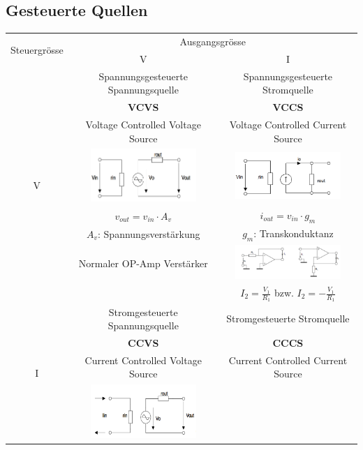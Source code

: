        \subsection{Gesteuerte Quellen}
			\begin{tabular}{|c|c|c|}
				\hline
				\multirow{2}{*}{Steuergrösse} & \multicolumn{2}{c|}{Ausgangsgrösse}\\ \cline{2-3}
				& V & I \\ \hline
				\multirow{8}{*}{V}	& Spannungsgesteuerte Spannungsquelle	& Spannungsgesteuerte Stromquelle		\\
									& \bf{VCVS}								& \bf{VCCS}								\\
									& Voltage Controlled Voltage Source		& Voltage Controlled Current Source		\\ \cline{2-3}
									& \includegraphics[width=4cm,trim=0 0 0 -5]{./images/vcvs.png}	
									& \includegraphics[width=4cm,trim=0 0 0 -5]{./images/vccs.png}					\\ \cline{2-3}
									& $v_{out}=v_{in} \cdot A_v$			& $i_{out} = v_{in} \cdot g_m$			\\
									& $A_v$: Spannungsverstärkung			& $g_m$: Transkonduktanz				\\ \cline{2-3}
									& Normaler OP-Amp Verstärker
									& \includegraphics[width=4cm,trim=0 0 0 -5]{./images/vccs_schaltung.png}		\\
									&	& $I_2=\frac{V_1}{R_1}$ bzw. $I_2=-\frac{V_1}{R_1}$							\\ 	\hline	
				\multirow{8}{*}{I}	& Stromgesteuerte Spannungsquelle		& Stromgesteuerte Stromquelle			\\
									& \bf{CCVS}								& \bf{CCCS}								\\
									& Current Controlled Voltage Source		& Current Controlled Current Source		\\ \cline{2-3}
									& \includegraphics[width=4cm,trim=0 0 0 -5]{./images/ccvs.png}	

\end{tabular}
